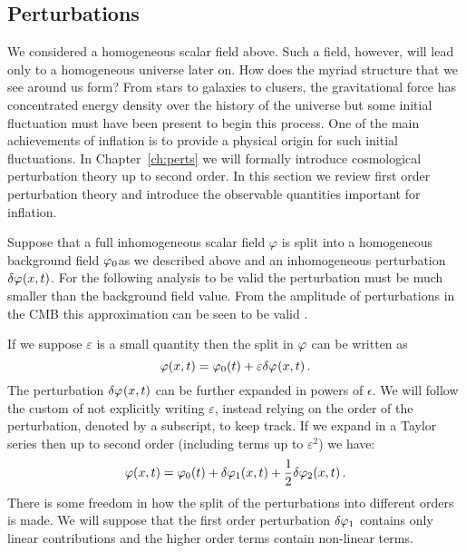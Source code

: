 \subsection{Perturbations}
\label{sec:perts-intro}

We considered a homogeneous scalar field above. Such a field, however, will
lead only to a homogeneous universe later on. How does the myriad structure
that we see around us form? From stars to galaxies to clusers, the
gravitational force has concentrated energy density over the history of the
universe but some initial fluctuation must have been present to begin this
process. One of the main achievements of inflation is to provide a physical
origin for
such initial fluctuations. In Chapter~\ref{ch:perts} we will formally introduce
cosmological perturbation theory up to second order. In this section we 
review first order perturbation theory and introduce the observable quantities
important for inflation.


Suppose that a full inhomogeneous scalar field
$\varphi$ is split into a homogeneous background field $\varphi_0$as we described
above and an inhomogeneous perturbation $\delta\varphi_{}(x,t)$. For the following
analysis to be valid the perturbation must be much smaller than the background
field value. From the amplitude of perturbations in the CMB this approximation
can be seen to be valid \cite{Komatsu:2008hk}. 

If we suppose $\varepsilon$ is a small quantity then the split in $\varphi$
can be written as \cite{Malik:2008im}
% 
\begin{equation}
\label{eq:pertsplit-intro}
\varphi(x, t) = \varphi_0(t) + \varepsilon\delta\varphi_{}(x,t) \,.
\end{equation}
% 
 The perturbation $\delta\varphi_{}(x, t)$ can be further expanded in
powers of $\epsilon$.  We will follow the
custom of not explicitly writing $\varepsilon$, instead relying on the order of
the perturbation, denoted by a subscript, to keep track.
If we expand in a Taylor series then up to second order (\ie including terms
up to $\varepsilon^2$) we have:
% 
\begin{equation}
 \varphi(x,t) = \varphi_0(t) + \delta\varphi_{1}(x,t) + \frac{1}{2}\delta\varphi_{2}(x,t) \,.
\end{equation}
% 
There is some freedom in how the split of the perturbations into different
orders is made. We will suppose that the first order perturbation $\delta\varphi_{1}$
contains only linear contributions and the higher order terms contain non-linear
terms. 


